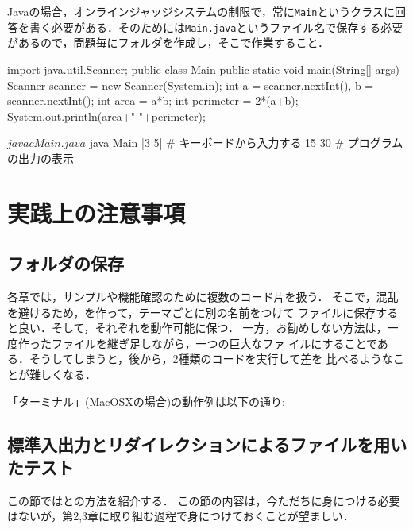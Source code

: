 Javaの場合，オンラインジャッジシステムの制限で，常に\texttt{Main}というクラスに回答を書く必要がある．そのためには\texttt{Main.java}というファイル名で保存する必要があるので，問題毎にフォルダを作成し，そこで作業すること．
\begin{javabox}[emph={Main}]
import java.util.Scanner;
public class Main {
    public static void main(String[] args) {
	Scanner scanner = new Scanner(System.in);
	int a = scanner.nextInt(), b = scanner.nextInt();
	int area = a*b;
	int perimeter = 2*(a+b);
	System.out.println(area+" "+perimeter);
    }
}
\end{javabox}

\begin{terminal}
$ javac Main.java
$ java Main
|3 5| # キーボードから入力する
15 30 # プログラムの出力の表示
\end{terminal}


\section{実践上の注意事項}\label{section:commands}
\subsection{フォルダの保存}
各章では，サンプルや機能確認のために複数のコード片を扱う．
そこで，混乱を避けるため，を作って，テーマごとに別の名前をつけて
ファイルに保存すると良い．そして，それぞれを動作可能に保つ．
一方，お勧めしない方法は，一度作ったファイルを継ぎ足しながら，一つの巨大なファ
イルにすることである．そうしてしまうと，後から，2種類のコードを実行して差を
比べるようなことが難しくなる．

「ターミナル」(MacOSXの場合)の動作例は以下の通り:

\subsection{標準入出力とリダイレクションによるファイルを用いたテスト}

この節ではとの方法を紹介する．
この節の内容は，今ただちに身につける必要はないが，第2,3章に取り組む過程で身につけておくことが望ましい．

